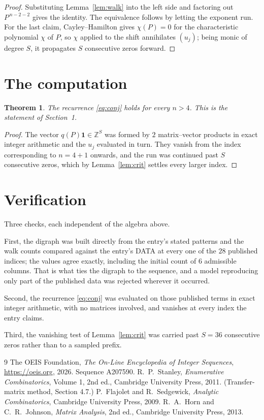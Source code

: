 \documentclass[11pt,a4paper]{article}
\theoremstyle{plain}
\newtheorem{theorem}{Theorem}
\theoremstyle{definition}
\begin{document}
\begin{proof}
Substituting Lemma~\ref{lem:walk} into the left side and factoring out
$P^{\,n-2-2}$ gives the identity. The equivalence follows by letting the exponent
run. For the last claim, Cayley--Hamilton gives $\chi(P)=0$ for the characteristic
polynomial $\chi$ of $P$, so $\chi$ applied to the shift annihilates $(u_j)$; being monic of
degree $S$, it propagates $S$ consecutive zeros forward.
\end{proof}

\section{The computation}

\begin{theorem}
The recurrence \eqref{eq:conj} holds for every $n>4$. This is the statement of
Section~1.
\end{theorem}

\begin{proof}
The vector $q(P)\mathbf{1}\in\mathbb{Z}^{S}$ was formed by $2$ matrix--vector
products in exact integer arithmetic and the $u_j$ evaluated in turn. They vanish from the
index corresponding to $n=4+1$ onwards, and the run was continued past $S$ consecutive
zeros, which by Lemma~\ref{lem:crit} settles every larger index.
\end{proof}

\section{Verification}

Three checks, each independent of the algebra above.

First, the digraph was built directly from the entry's stated patterns and the walk counts
compared against the entry's DATA at every one of the $28$ published indices; the
values agree exactly, including the initial count of $6$ admissible columns. That is
what ties the digraph to the sequence, and a model reproducing only part of the published
data was rejected wherever it occurred.

Second, the recurrence \eqref{eq:conj} was evaluated on those published terms in exact
integer arithmetic, with no matrices involved, and vanishes at every index the entry claims.

Third, the vanishing test of Lemma~\ref{lem:crit} was carried past $S=36$ consecutive
zeros rather than to a sampled prefix.

\begin{thebibliography}{9}
 The OEIS Foundation, \emph{The On-Line Encyclopedia of Integer
Sequences}, \url{https://oeis.org}, 2026. Sequence A207590.
 R.~P.~Stanley, \emph{Enumerative Combinatorics}, Volume 1, 2nd ed.,
Cambridge University Press, 2011. (Transfer-matrix method, Section 4.7.)
 P.~Flajolet and R.~Sedgewick, \emph{Analytic Combinatorics}, Cambridge
University Press, 2009.
 R.~A.~Horn and C.~R.~Johnson, \emph{Matrix Analysis}, 2nd ed., Cambridge
University Press, 2013.
\end{thebibliography}
\end{document}
